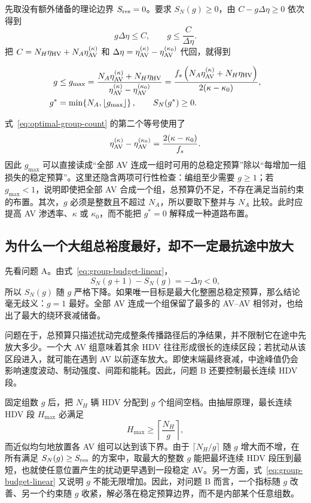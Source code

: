 \documentclass[11pt,a4paper,openany]{book}
\numberwithin{equation}{chapter}
\numberwithin{figure}{chapter}
\numberwithin{table}{chapter}
\begin{document}
先取没有额外储备的理论边界 $S_{\rm res}=0$。要求 $S_N(g)\ge0$，由 $C-g\Delta\eta\ge0$ 依次得到
\[
g\Delta\eta\le C,
\qquad
g\le\frac{C}{\Delta\eta}.
\]
把 $C=N_H\eta_{\rm HV}+N_A\eta_{\rm AV}^{(\kappa)}$ 和 $\Delta\eta=\eta_{\rm AV}^{(\kappa)}-\eta_{\rm AV}^{(\kappa_0)}$ 代回，就得到
\begin{tcolorbox}[keybox,title=\textbf{组数上限与整数可行解}]
\begin{align}
g&\le g_{\max}
=\frac{N_A\eta_{\rm AV}^{(\kappa)}+N_H\eta_{\rm HV}}
{\eta_{\rm AV}^{(\kappa)}-\eta_{\rm AV}^{(\kappa_0)}}
=\frac{f_s\left(N_A\eta_{\rm AV}^{(\kappa)}+N_H\eta_{\rm HV}\right)}
{2(\kappa-\kappa_0)}, \\
g^*&=\min\!\left\{N_A,\left\lfloor g_{\max}\right\rfloor\right\},
\qquad S_N(g^*)\ge0.
\label{eq:optimal-group-count}
\end{align}
\end{tcolorbox}
式~\eqref{eq:optimal-group-count} 的第二个等号使用了
\[
\eta_{\rm AV}^{(\kappa)}-\eta_{\rm AV}^{(\kappa_0)}
=\frac{2(\kappa-\kappa_0)}{f_s}.
\]
因此 $g_{\max}$ 可以直接读成“全部 AV 连成一组时可用的总稳定预算”除以“每增加一组损失的稳定预算”。这里还隐含两项可行性检查：编组至少需要 $g\ge1$；若 $g_{\max}<1$，说明即使把全部 AV 合成一个组，总预算仍不足，不存在满足当前约束的布置。其次，$g$ 必须是整数且不超过 $N_A$，所以要取下整并与 $N_A$ 比较。此时应提高 AV 渗透率、$\kappa$ 或 $\kappa_0$，而不能把 $g^*=0$ 解释成一种道路布置。

\subsection{为什么一个大组总裕度最好，却不一定最抗途中放大}

先看问题 A。由式~\eqref{eq:group-budget-linear}，
\[
S_N(g+1)-S_N(g)=-\Delta\eta<0,
\]
所以 $S_N(g)$ 随 $g$ 严格下降。如果唯一目标是最大化整圈总稳定预算，那么结论毫无歧义：$g=1$ 最好。全部 AV 连成一个组保留了最多的 AV--AV 相邻对，也给出了最大的绕环衰减储备。

问题在于，总预算只描述扰动完成整条传播路径后的净结果，并不限制它在途中先放大多少。一个大 AV 组意味着其余 HDV 往往形成很长的连续区段；若扰动从该区段进入，就可能在遇到 AV 以前逐车放大。即使末端最终衰减，中途峰值仍会影响速度波动、制动强度、间距和能耗。因此，问题 B 还要控制最长连续 HDV 段。

固定组数 $g$ 后，把 $N_H$ 辆 HDV 分配到 $g$ 个组间空档。由抽屉原理，最长连续 HDV 段 $H_{\max}$ 必满足
\begin{equation}
H_{\max}\ge\left\lceil\frac{N_H}{g}\right\rceil,
\label{eq:group-pigeonhole}
\end{equation}
而近似均匀地放置各 AV 组可以达到该下界。由于 $\lceil N_H/g\rceil$ 随 $g$ 增大而不增，在所有满足 $S_N(g)\ge S_{\rm res}$ 的方案中，取最大的整数 $g$ 能把最坏连续 HDV 段压到最短，也就使任意位置产生的扰动更早遇到一段稳定 AV。另一方面，式~\eqref{eq:group-budget-linear} 又说明 $g$ 不能无限增加。因此，对问题 B 而言，一个指标随 $g$ 改善、另一个约束随 $g$ 收紧，解必落在稳定预算边界，而不是内部某个任意组数。
\end{document}
